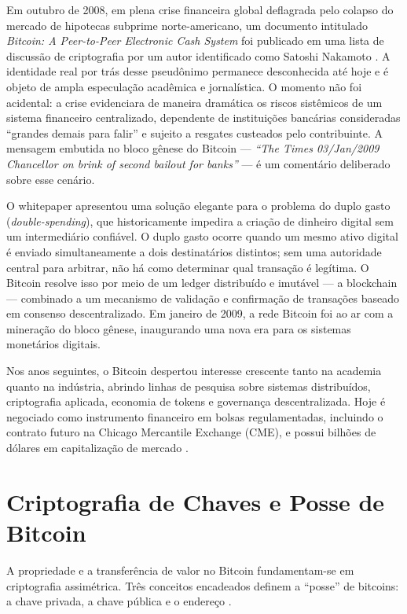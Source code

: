 \documentclass[12pt,a4paper]{report}
\begin{document}
Em outubro de 2008, em plena crise financeira global deflagrada pelo colapso do mercado de hipotecas subprime norte-americano, um documento intitulado \textit{Bitcoin: A Peer-to-Peer Electronic Cash System} foi publicado em uma lista de discussão de criptografia por um autor identificado como Satoshi Nakamoto \cite{Bashir2023}. A identidade real por trás desse pseudônimo permanece desconhecida até hoje e é objeto de ampla especulação acadêmica e jornalística. O momento não foi acidental: a crise evidenciara de maneira dramática os riscos sistêmicos de um sistema financeiro centralizado, dependente de instituições bancárias consideradas ``grandes demais para falir'' e sujeito a resgates custeados pelo contribuinte. A mensagem embutida no bloco gênese do Bitcoin --- \textit{``The Times 03/Jan/2009 Chancellor on brink of second bailout for banks''} --- é um comentário deliberado sobre esse cenário.

O whitepaper apresentou uma solução elegante para o problema do duplo gasto (\textit{double-spending}), que historicamente impedira a criação de dinheiro digital sem um intermediário confiável. O duplo gasto ocorre quando um mesmo ativo digital é enviado simultaneamente a dois destinatários distintos; sem uma autoridade central para arbitrar, não há como determinar qual transação é legítima. O Bitcoin resolve isso por meio de um ledger distribuído e imutável --- a blockchain --- combinado a um mecanismo de validação e confirmação de transações baseado em consenso descentralizado. Em janeiro de 2009, a rede Bitcoin foi ao ar com a mineração do bloco gênese, inaugurando uma nova era para os sistemas monetários digitais.

Nos anos seguintes, o Bitcoin despertou interesse crescente tanto na academia quanto na indústria, abrindo linhas de pesquisa sobre sistemas distribuídos, criptografia aplicada, economia de tokens e governança descentralizada. Hoje é negociado como instrumento financeiro em bolsas regulamentadas, incluindo o contrato futuro na Chicago Mercantile Exchange (CME), e possui bilhões de dólares em capitalização de mercado \cite{Bashir2023}.

\section{Criptografia de Chaves e Posse de Bitcoin}

A propriedade e a transferência de valor no Bitcoin fundamentam-se em criptografia assimétrica. Três conceitos encadeados definem a ``posse'' de bitcoins: a chave privada, a chave pública e o endereço \cite{Bashir2023}.
\end{document}

